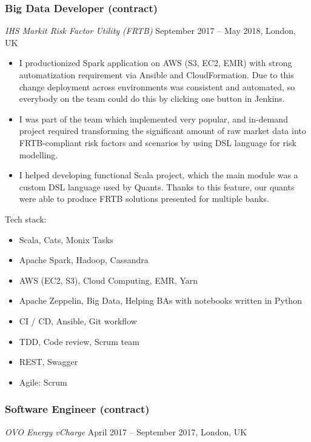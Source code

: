 \documentclass[]{rss}
\providecommand{\tightlist}{%
  \setlength{\itemsep}{0pt}\setlength{\parskip}{0pt}}
\begin{document}
\begin{resume}
\subsubsection{Big Data Developer
(contract)}\label{big-data-developer-contract}

\emph{IHS Markit \textbar{} Risk Factor Utility (FRTB)} September 2017
-- May 2018, London, UK

\begin{itemize}
\item
  I productionized Spark application on AWS (S3, EC2, EMR) with strong
  automatization requirement via Ansible and CloudFormation. Due to this
  change deployment across environments was consistent and automated, so
  everybody on the team could do this by clicking one button in Jenkins.
\item
  I was part of the team which implemented very popular, and in-demand
  project required transforming the significant amount of raw market
  data into FRTB-compliant risk factors and scenarios by using DSL
  language for risk modelling.
\item
  I helped developing functional Scala project, which the main module
  was a custom DSL language used by Quants. Thanks to this feature, our
  quants were able to produce FRTB solutions presented for multiple
  banks.
\end{itemize}

Tech stack:

\begin{itemize}
\tightlist
\item
  Scala, Cats, Monix Tasks
\item
  Apache Spark, Hadoop, Cassandra
\item
  AWS (EC2, S3), Cloud Computing, EMR, Yarn
\item
  Apache Zeppelin, Big Data, Helping BAs with notebooks written in
  Python
\item
  CI / CD, Ansible, Git workflow
\item
  TDD, Code review, Scrum team
\item
  REST, Swagger
\item
  Agile: Scrum
\end{itemize}

\subsubsection{Software Engineer
(contract)}\label{software-engineer-contract}

\emph{OVO Energy \textbar{} vCharge} April 2017 -- September 2017,
London, UK


\end{resume}
\end{document}
